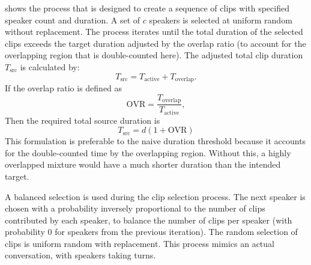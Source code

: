  shows the process that is designed to create a sequence of clips with specified speaker count and duration. A set of $c$ speakers is selected at uniform random without replacement. The process iterates until the total duration of the selected clips exceeds the target duration adjusted by the overlap ratio (to account for the overlapping region that is double-counted here). The adjusted total clip duration $T_{\mathrm{src}}$ is calculated by:
\begin{equation}
T_{\mathrm{src}} = T_{\mathrm{active}} + T_{\mathrm{overlap}}.
\end{equation}
If the overlap ratio is defined as
\begin{equation}
 \mathrm{OVR} = \frac{T_{\mathrm{overlap}}}{T_{\mathrm{active}}},
\end{equation}
Then the required total source duration is 
\begin{equation}
T_\mathrm{src} = d(1+\mathrm{OVR})
\end{equation}
This formulation is preferable to the naive duration threshold because it accounts for the double-counted time by the overlapping region. Without this, a highly overlapped mixture would have a much shorter duration than the intended target.

A balanced selection is used during the clip selection process. The next speaker is chosen with a probability inversely proportional to the number of clips contributed by each speaker, to balance the number of clips per speaker (with probability 0 for speakers from the previous iteration). The random selection of clips is uniform random with replacement. This process mimics an actual conversation, with speakers taking turns.

